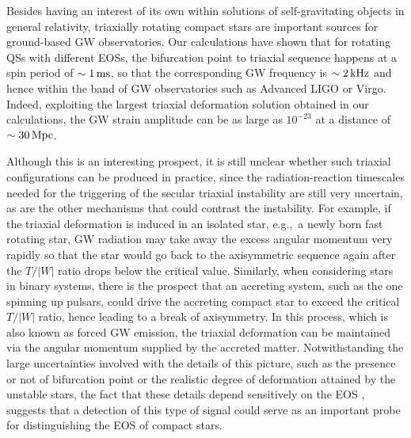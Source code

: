 \documentclass[twocolumn,superscriptaddress,showpacs,prd,aps,amsmath,amssymb,nofootinbib]{revtex4-1}
\newcommand{\eg}{e.g.,~}
\begin{document}
Besides having an interest of its own within solutions of
self-gravitating objects in general relativity, triaxially rotating
compact stars are important sources for ground-based GW
observatories. Our calculations have shown that for rotating QSs with
different EOSs, the bifurcation point to triaxial
sequence happens at a spin period of $\sim 1\,{\rm ms}$, so that the
corresponding GW frequency is $\sim 2\,{\rm kHz}$ and hence within the
band of GW observatories such as Advanced LIGO or Virgo. Indeed,
exploiting the largest triaxial deformation solution obtained in our
calculations, the GW strain amplitude can be as large as $10^{-23}$ at a
distance of $\sim 30\,{\rm Mpc}$.

Although this is an interesting prospect, it is still unclear whether
such triaxial configurations can be produced in practice, since the
radiation-reaction timescales needed for the triggering of the secular
triaxial instability are still very uncertain, as are the other
mechanisms that could contrast the instability. For example, if the
triaxial deformation is induced in an isolated star, \eg a newly born
fast rotating star, GW radiation may take away the excess angular
momentum very rapidly so that the star would go back to the axisymmetric
sequence again after the $T/|W|$ ratio drops below the critical value.
Similarly, when considering stars in binary systems, there is the
prospect that an accreting system, such as the one spinning up pulsars,
could drive the accreting compact star to exceed the critical $T/|W|$
ratio, hence leading to a break of axisymmetry. In this process, which is
also known as forced GW emission, the triaxial deformation can be
maintained via the angular momentum supplied by the accreted
matter. Notwithstanding the large uncertainties involved with the details
of this picture, such as the presence or not of
bifurcation point or the realistic degree of deformation attained by the
unstable stars, the fact that these details depend sensitively on the EOS
\cite{Uryu2016b}, suggests that a detection of this type of signal could
serve as an important probe for distinguishing the EOS of compact stars.
\end{document}
